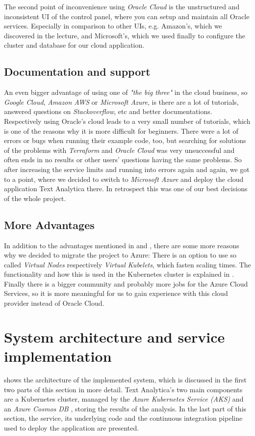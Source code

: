\documentclass[conference]{IEEEtran}
\begin{document}
The second point of inconvenience using \textit{Oracle Cloud} is the unstructured and inconsistent UI of the control panel, where you can setup and maintain all Oracle services. Especially in comparison to other UIs, e.g. Amazon's, which we discovered in the lecture, and Microsoft's, which we used finally to configure the cluster and database for our cloud application.

\subsection{Documentation and support}
\label{subsec:docandsupport}
An even bigger advantage of using one of \textit{"the big three"} in the cloud business, so \textit{Google Cloud}, \textit{Amazon AWS} or \textit{Microsoft Azure}, is there are a lot of tutorials, answered questions on \textit{Stackoverflow}, etc and better documentations. Respectively using Oracle's cloud leads to
a very small number of tutorials, which is one of the reasons why it is more difficult for beginners. There were a lot of errors or bugs when running their example code, too, but searching for solutions of the problems with \textit{Terraform} and \textit{Oracle Cloud} was very unsuccessful and often ends in no results or other users' questions having the same problems.
So after increasing the service limits and running into errors again and again, we got to a point, where we decided to switch to \textit{Microsoft Azure} and deploy the cloud application Text Analytica there.
In retrospect this was one of our best decisions of the whole project.

\subsection{More Advantages}
In addition to the advantages mentioned in  and , there are some more reasons why we decided to migrate the project to Azure:
There is an option to use so called \textit{Virtual Nodes} respectively \textit{Virtual Kubelets}, which fasten scaling times. The functionality and how this is used in the Kubernetes cluster is explained in .
Finally there is a bigger community and probably more jobs for the Azure Cloud Services, so it is more meaningful for us to gain experience with this cloud provider instead of Oracle Cloud.

\section{System architecture and service implementation}
\label{sec:system-architecture}
 shows the architecture of the implemented system, which is discussed in the first two parts of this section in more detail. Text Analytica's two main components are a Kubernetes cluster, managed by the \textit{Azure Kubernetes Service (AKS)} \cite{AKS} and an \textit{Azure Cosmos DB} \cite{CosmosDB}, storing the results of the analysis. In the last part of this section, the service, its underlying code and the continuous integration pipeline used to deploy the application are presented.
\end{document}
